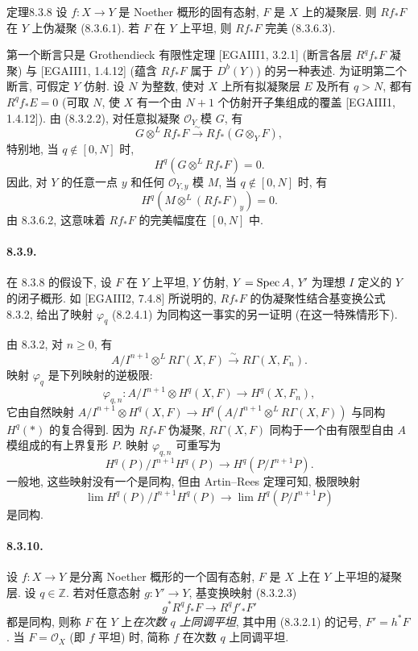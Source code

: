\begin{origstatement}{定理}{8.3.8}\label{ch08:th838}
设 $f:X\to Y$ 是 Noether 概形的固有态射, $F$ 是 $X$ 上的凝聚层. 则 $Rf_*F$ 在 $Y$ 上伪凝聚 (8.3.6.1). 若 $F$ 在 $Y$ 上平坦, 则 $Rf_*F$ 完美 (8.3.6.3).
\end{origstatement}
第一个断言只是 Grothendieck 有限性定理 [EGAIII1, 3.2.1] (断言各层 $R^qf_*F$ 凝聚) 与 [EGAIII1, 1.4.12] (蕴含 $Rf_*F$ 属于 $D^b(Y)$) 的另一种表述. 为证明第二个断言, 可假定 $Y$ 仿射. 设 $N$ 为整数, 使对 $X$ 上所有拟凝聚层 $E$ 及所有 $q>N$, 都有 $R^qf_*E=0$ (可取 $N$, 使 $X$ 有一个由 $N+1$ 个仿射开子集组成的覆盖 [EGAIII1, 1.4.12]). 由 (8.3.2.2), 对任意拟凝聚 $\mathcal O_Y$ 模 $G$, 有
\[G\otimes^LRf_*F\xrightarrow\sim Rf_*(G\otimes_YF),\]
特别地, 当 $q\notin[0,N]$ 时,
\[H^q(G\otimes^LRf_*F)=0.\]
因此, 对 $Y$ 的任意一点 $y$ 和任何 $\mathcal O_{Y,y}$ 模 $M$, 当 $q\notin[0,N]$ 时, 有
\[H^q(M\otimes^L(Rf_*F)_y)=0.\]
由 8.3.6.2, 这意味着 $Rf_*F$ 的完美幅度在 $[0,N]$ 中.

\paragraph{8.3.9.}
在 8.3.8 的假设下, 设 $F$ 在 $Y$ 上平坦, $Y$ 仿射, $Y=\operatorname{Spec} A$, $Y'$ 为理想 $I$ 定义的 $Y$ 的闭子概形. 如 [EGAIII2, 7.4.8] 所说明的, $Rf_*F$ 的伪凝聚性结合基变换公式 8.3.2, 给出了映射 $\varphi_q$ (8.2.4.1) 为同构这一事实的另一证明 (在这一特殊情形下).

由 8.3.2, 对 $n\geq0$, 有
\begin{equation}A/I^{n+1}\otimes^LR\Gamma(X,F)\xrightarrow\sim R\Gamma(X,F_n).\tag{*}\label{ch08:eq839star}\end{equation}
映射 $\varphi_q$ 是下列映射的逆极限:
\[\varphi_{q,n}:A/I^{n+1}\otimes H^q(X,F)\longrightarrow H^q(X,F_n),\]
它由自然映射 $A/I^{n+1}\otimes H^q(X,F)\to H^q(A/I^{n+1}\otimes^LR\Gamma(X,F))$ 与同构 $H^q(*)$ 的复合得到. 因为 $Rf_*F$ 伪凝聚, $R\Gamma(X,F)$
同构于一个由有限型自由 $A$ 模组成的有上界复形 $P$. 映射 $\varphi_{q,n}$ 可重写为
\[H^q(P)/I^{n+1}H^q(P)\longrightarrow H^q(P/I^{n+1}P).\]
一般地, 这些映射没有一个是同构, 但由 Artin--Rees 定理可知, 极限映射
\[\lim H^q(P)/I^{n+1}H^q(P)\longrightarrow\lim H^q(P/I^{n+1}P)\]
是同构.

\paragraph{8.3.10.}
设 $f:X\to Y$ 是分离 Noether 概形的一个固有态射, $F$ 是 $X$ 上在 $Y$ 上平坦的凝聚层. 设 $q\in\mathbb Z$. 若对任意态射 $g:Y'\to Y$, 基变换映射 (8.3.2.3)
\begin{equation}g^*R^qf_*F\longrightarrow R^qf'_*F'\tag{8.3.10.1}\label{ch08:eq83101}\end{equation}
都是同构, 则称 $F$ 在 $Y$ 上\emph{在次数 $q$ 上同调平坦}, 其中用 (8.3.2.1) 的记号, $F'=h^*F$. 当 $F=\mathcal O_X$ (即 $f$ 平坦) 时, 简称 $f$ 在次数 $q$ 上同调平坦.

